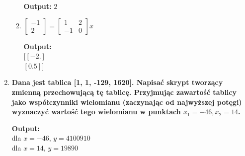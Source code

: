 \documentclass[12pt]{article}
\newenvironment{shbox}
{\begin{tcolorbox}[enhanced, boxrule=0pt, drop fuzzy shadow southeast]}
{\end{tcolorbox}}
\begin{document}
\begin{enumerate}
\begin{enumerate}
\begin{shbox}
                        \textbf{Output:} $2$
                    \end{shbox}
                \item $
                    \begin{bmatrix}
                        -1\\
                        2
                    \end{bmatrix} =
                    \begin{bmatrix}
                        1& 2\\
                        -1& 0
                    \end{bmatrix} x$\\
                    \begin{shbox}
                        \textbf{Output:} \\
                        $[[-2. ]$\\
                        $[ 0.5]]$
                    \end{shbox}
            \end{enumerate}
            \item\textbf{Dana jest tablica [1, 1, -129, 1620]. Napisać skrypt tworzący zmienną przechowującą
            tę tablicę. Przyjmując zawartość tablicy jako współczynniki wielomianu (zaczynając od
            najwyższej potęgi) wyznaczyć wartość tego wielomianu w punktach $x_1=-46, x_2=14$.}
            \begin{shbox}
                \textbf{Output:} \\
                dla $x=-46$, $y=4100910$\\
                dla $x=14$, $y=19890$
            \end{shbox}
        \end{enumerate}
\end{document}
